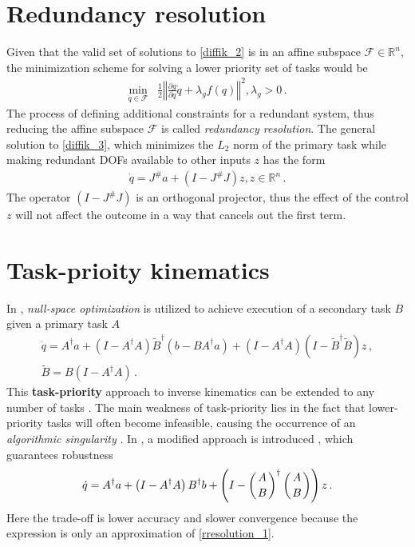 \documentclass[times, utf8, diplomski, english]{fer}
\begin{document}
\section{Redundancy resolution}\label{section:redundancy resolution}
Given that the valid set of solutions to \ref{diffik_2} is in an affine subspace $\mathcal{F} \in \mathbb{R}^n$, the minimization scheme for solving a lower priority set of tasks would be
\begin{align}
\label{diffik_3}
\min\limits_{\dot{q} \in \mathcal{F}} & \frac{1}{2}\left\Vert\frac{\partial g}{\partial q} \dot{q} + \lambda_{g}f\left(q\right)\right\Vert^2 , \lambda_{g} > 0\, .
\end{align}
The process of defining additional constraints for a redundant system, thus reducing the affine subspace $\mathcal{F}$ is called \textit{redundancy resolution}.
The general solution to \eqref{diffik_3}, which minimizes the $L_2$ norm of the primary task while making redundant DOFs available to other inputs $z$ has the form
\begin{align}
\label{rresolution_0}
\dot{q} = J^{\#}a + \left(I - J^{\#}J\right)z ,  z \in \mathbb{R}^n\, .
\end{align}
The operator $\left(I - J^{\#}J\right)$ is an orthogonal projector, thus the effect of the control $z$ will not affect the outcome in a way that cancels out the first term. 
\section{Task-prioity kinematics}\label{section:task priority}
In \citep{nakamura1987task,nakamura1990advanced}, \textit{null-space optimization} is utilized to achieve execution of a secondary task $B$ given a primary task $A$
\begin{subequations}
\begin{gather}
\label{rresolution_1}
\dot{q}  = A^{\dagger}a + \left(I - A^{\dagger}A\right)\tilde{B}^{\dagger}\left(b - BA^{\dagger}a\right) + 
\left(I - A^{\dagger}A\right) \left(I - \tilde{B}^{\dagger}\tilde{B}\right)z\, ,\\
\tilde{B}  = B\left(I - A^{\dagger}A\right)\, .
\end{gather}
\end{subequations}
This \textbf{task-priority} approach to inverse kinematics can be extended to any number of tasks \citep{slotine1991general}.
The main weakness of task-priority lies in the fact that lower-priority tasks will often become infeasible, causing the occurrence of an \textit{algorithmic singularity} \citep{baillieul1985kinematic}.
In \citep{chiaverini1997singularity}, a modified approach is introduced , which guarantees robustness 
\begin{align}
\label{rresolution_2}
\dot{q} = A^{\dagger}a + \left(I - A^{\dagger}A\right)B^{\dagger}b + 
\left(I - \left(A \atop B\right)^{\dagger}\left(A \atop B\right)\right)z\, .
\end{align}
Here the trade-off is lower accuracy and slower convergence because the expression is only an approximation of \eqref{rresolution_1}.
\end{document}
